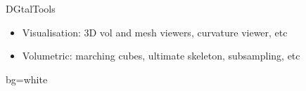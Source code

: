 \documentclass[noamsthm, pdftex, french]{beamer}
\begin{document}
\begin{frame}
\begin{columns}
\begin{alertblock}{\centering DGtalTools}
\begin{itemize}
      \item Visualisation: 3D vol and mesh viewers, curvature viewer, etc
      \item Volumetric: marching cubes, ultimate skeleton, subsampling, etc
      \end{itemize}
      \centering
      \vspace*{1cm}
      \hspace*{0.4cm}
      \hspace*{0.4cm}
      \begin{beamercolorbox}{bg=white}
      \end{beamercolorbox}
    \end{alertblock}
    

    

\end{columns}
\end{frame}
\end{document}
